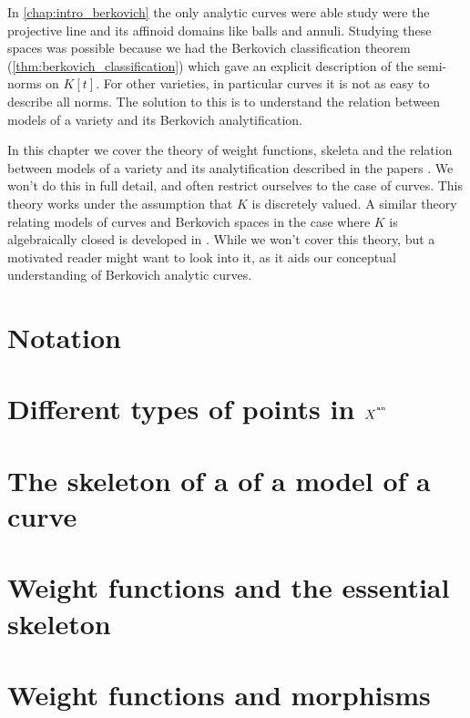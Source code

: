 In \cref{chap:intro_berkovich} the only analytic curves were able study were the projective line and its affinoid domains like balls and annuli.
Studying these spaces was possible because we had the Berkovich classification  theorem (\cref{thm:berkovich_classification}) which gave an explicit description of the semi-norms on $K[t]$. 
For other varieties, in particular curves it is not as easy to describe all norms.
The solution to this is to understand the relation between models of a variety and its Berkovich analytification. 


In this chapter we cover the theory of weight functions, skeleta and the relation between models of a variety and its analytification described in the papers \cite{mustataWeightFunctionsNonArchimedean2015, nicaiseBerkovichSkeletaBirational2016, bakerWeightFunctionsBerkovich2016}.
We won't do this in full detail, and often restrict ourselves to the case of curves.
This theory works under the assumption that $K$ is discretely valued. 
A similar theory relating models of curves and Berkovich spaces in the case where $K$ is algebraically closed is developed in \cite{bakerStructureNonarchimedeanAnalytic2013}. 
While we won't cover this theory, but a motivated reader might want to look into it, as it aids our conceptual understanding of Berkovich analytic curves.  



\section{Notation} \label{sec:notation}


\section{Different types of points in $X^{{}^{\text{an}}}$} \label{sec:different_types_of_points_in_xan}


\section{The skeleton of a of a model of a curve} \label{sec:the_dual_graph_of_a_model_of_a_curve}



\section{Weight functions and the essential skeleton} \label{sec:weight_functions}


\section{Weight functions and morphisms} \label{sec:weight_functions_and_morphisms}



